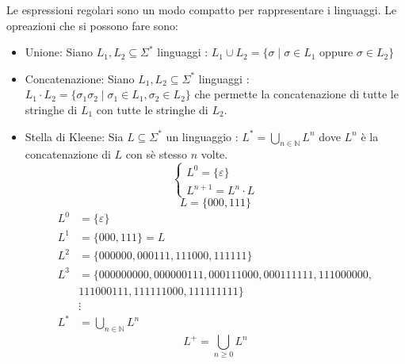 \documentclass[a4paper]{article}
\begin{document}
Le espressioni regolari sono un modo compatto per rappresentare i linguaggi.
Le opreazioni che si possono fare sono:
\begin{itemize}
  \item Unione: Siano $L_1, L_2 \subseteq \Sigma^*$ linguaggi : $L_1 \cup L_2 = \{\sigma \; | \; \sigma \in L_1 \text{ oppure } \sigma \in L_2\}$
  \item Concatenazione: Siano $L_1, L_2 \subseteq \Sigma^*$ linguaggi : $L_1 \cdot L_2 = \{\sigma_1 \sigma_2 \; | \; \sigma_1 \in L_1, \sigma_2 \in L_2\}$ che permette
  la concatenazione di tutte le stringhe di $L_1$ con tutte le stringhe di $L_2$.
  \item Stella di Kleene: Sia $L \subseteq \Sigma^*$ un linguaggio : $L^* = \bigcup_{n \in \mathbb{N}} L^n$ dove 
  $L^n$ è la concatenazione di $L$ con sè stesso $n$ volte.
  \[
  \begin{cases}
    L^0 = \{\varepsilon\}\\
    L^{n+1} = L^n \cdot L
  \end{cases}
  \]
  \[L = \{000, 111\}\]
  \[
  \begin{aligned}
    L^0 &= \{\varepsilon\}\\
    L^1 &= \{000, 111\} = L\\
    L^2 &= \{000000, 000111, 111000, 111111\}\\
    L^3 &= \{000000000, 000000111, 000111000, 000111111, 111000000, 
    \\&111000111, 111111000, 111111111\}\\
    &\vdots\\
    L^* &= \bigcup_{n \in \mathbb{N}} L^n
  \end{aligned}
  \]
  \[L^+ = \bigcup_{n \ge 0} L^n\]
\end{itemize}
\end{document}

